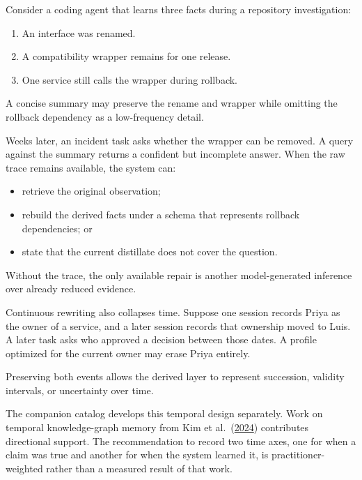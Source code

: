 
Consider a coding agent that learns three facts during a repository investigation:

\begin{enumerate}
\def\labelenumi{\arabic{enumi}.}
\tightlist
\item
  An interface was renamed.
\item
  A compatibility wrapper remains for one release.
\item
  One service still calls the wrapper during rollback.
\end{enumerate}

A concise summary may preserve the rename and wrapper while omitting the rollback dependency as a low-frequency detail.


Weeks later, an incident task asks whether the wrapper can be removed. A query against the summary returns a confident but incomplete answer. When the raw trace remains available, the system can:

\begin{itemize}
\tightlist
\item
  retrieve the original observation;
\item
  rebuild the derived facts under a schema that represents rollback dependencies; or
\item
  state that the current distillate does not cover the question.
\end{itemize}

Without the trace, the only available repair is another model-generated inference over already reduced evidence.

Continuous rewriting also collapses time. Suppose one session records Priya as the owner of a service, and a later session records that ownership moved to Luis. A later task asks who approved a decision between those dates. A profile optimized for the current owner may erase Priya entirely.

Preserving both events allows the derived layer to represent succession, validity intervals, or uncertainty over time.

The companion catalog develops this temporal design separately. Work on temporal knowledge-graph memory from Kim et al.~(\href{https://arxiv.org/abs/2408.05861}{2024}) contributes directional support. The recommendation to record two time axes, one for when a claim was true and another for when the system learned it, is practitioner-weighted rather than a measured result of that work.

